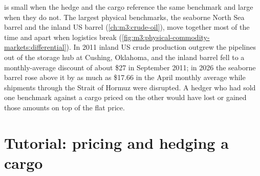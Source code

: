  is small when the hedge and the cargo reference the same benchmark and
large when they do not. The largest physical benchmarks, the seaborne North Sea
barrel and the inland US barrel (\cref{ch:m3:crude-oil}), move together most of
the time and apart when logistics break
(\cref{fig:m3:physical-commodity-markets:differential}). In 2011 inland US crude
production outgrew the pipelines out of the storage hub at Cushing, Oklahoma, and
the inland barrel fell to a monthly-average discount of about \$27 in September
2011; in 2026 the seaborne barrel rose above it by as much as \$17.66 in the
April monthly average while shipments through the Strait of Hormuz were disrupted.
A hedger who had sold one benchmark against a cargo priced on the other would have
lost or gained those amounts on top of the flat price.

\begin{omfigure}

\label{fig:m3:physical-commodity-markets:differential}
\end{omfigure}

\section{Tutorial: pricing and hedging a cargo}\label{tut:m3:physical-commodity-markets:hedge}

